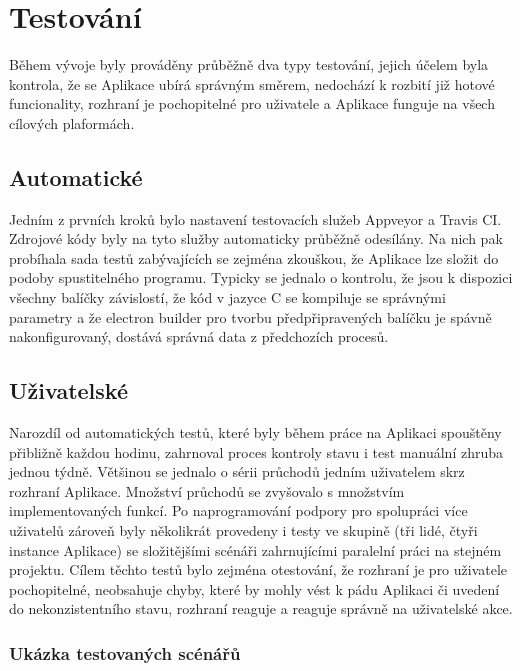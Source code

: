 \chapter{Testování}

Během vývoje byly prováděny průběžně dva typy testování, jejich účelem byla kontrola, že se Aplikace ubírá správným směrem, nedochází k rozbití již hotové funcionality, rozhraní je pochopitelné pro uživatele a Aplikace funguje na všech cílových plaformách.

\section{Automatické}

Jedním z prvních kroků bylo nastavení testovacích služeb Appveyor a Travis CI. Zdrojové kódy byly na tyto služby automaticky průběžně odesílány. Na nich pak probíhala sada testů zabývajících se zejména zkouškou, že Aplikace lze složit do podoby spustitelného programu. Typicky se jednalo o kontrolu, že jsou k dispozici všechny balíčky závislostí, že kód v jazyce C se kompiluje se správnými parametry a že electron builder pro tvorbu předpřipravených balíčku je spávně nakonfigurovaný, dostává správná data z předchozích procesů.

\section{Uživatelské}

Narozdíl od automatických testů, které byly během práce na Aplikaci spouštěny přibližně každou hodinu, zahrnoval proces kontroly stavu i test manuální zhruba jednou týdně. Většinou se jednalo o sérii průchodů jedním uživatelem skrz rozhraní Aplikace. Množství průchodů se zvyšovalo s množstvím implementovaných funkcí. Po naprogramování podpory pro spolupráci více uživatelů zároveň byly několikrát provedeny i testy ve skupině (tři lidé, čtyři instance Aplikace) se složitějšími scénáři zahrnujícími paralelní práci na stejném projektu. Cílem těchto testů bylo zejména otestování, že rozhraní je pro uživatele pochopitelné, neobsahuje chyby, které by mohly vést k pádu Aplikaci či uvedení do nekonzistentního stavu, rozhraní reaguje a reaguje správně na uživatelské akce.

\subsection{Ukázka testovaných scénářů}

